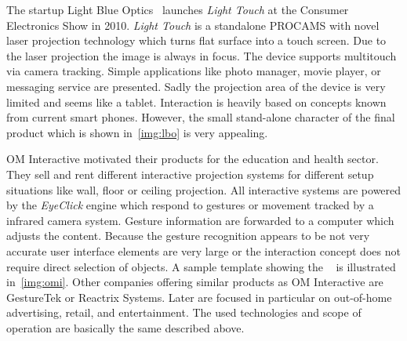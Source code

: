 \pagebreak
The startup Light Blue Optics~\cite{Blue:2014ab} launches \textit{Light Touch}\cite{Anonymous:NA7eH3SN} at the Consumer Electronics Show in 2010. \textit{Light Touch} is a standalone \ac{PROCAMS} with novel laser projection technology which turns flat surface into a touch screen. Due to the laser projection the image is always in focus. The device supports multitouch via camera tracking. Simple applications like photo manager, movie player, or messaging service are presented. Sadly the projection area of the device is very limited and seems like a tablet. Interaction is heavily based on concepts known from current smart phones. However, the small stand-alone character of the final product which is shown in~\autoref{img:lbo} is very appealing. 

OM Interactive motivated their products for the education and health sector. They sell and rent different interactive projection systems for different setup situations like wall, floor or ceiling projection. All interactive systems are powered by the \textit{EyeClick} engine which respond to gestures or movement tracked by a infrared camera system. Gesture information are forwarded to a computer which adjusts the content. Because the gesture recognition appears to be not very accurate user interface elements are very large or the interaction concept does not require direct selection of objects.
A sample template showing the ~\cite{Anonymous:QJL7w_S-} is illustrated in~\autoref{img:omi}. Other companies offering similar products as OM Interactive are GestureTek or Reactrix Systems. Later are focused in particular on out-of-home advertising, retail, and entertainment. The used technologies and scope of operation are basically the same described above.